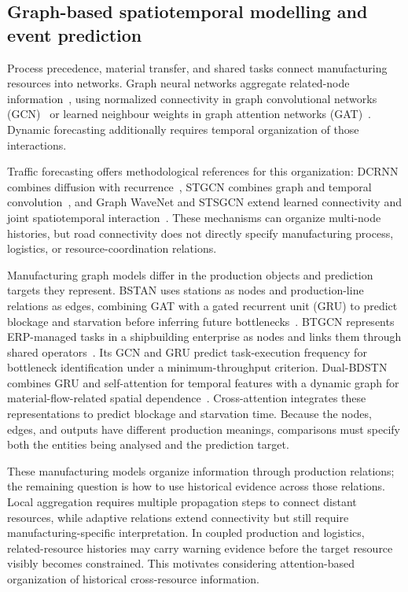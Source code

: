 \documentclass[a4paper,fleqn]{cas-dc}
\begin{document}
\subsection{Graph-based spatiotemporal modelling and event prediction}

Process precedence, material transfer, and shared tasks connect manufacturing resources into networks. Graph neural networks aggregate related-node information~\cite{wu2021gnn}, using normalized connectivity in graph convolutional networks (GCN)~\cite{kipf2017gcn} or learned neighbour weights in graph attention networks (GAT)~\cite{velickovic2018gat}. Dynamic forecasting additionally requires temporal organization of those interactions.

Traffic forecasting offers methodological references for this organization: DCRNN combines diffusion with recurrence~\cite{li2018dcrnn}, STGCN combines graph and temporal convolution~\cite{yu2018stgcn}, and Graph WaveNet and STSGCN extend learned connectivity and joint spatiotemporal interaction~\cite{wu2019graphwavenet,song2020stsgcn}. These mechanisms can organize multi-node histories, but road connectivity does not directly specify manufacturing process, logistics, or resource-coordination relations.

Manufacturing graph models differ in the production objects and prediction targets they represent. BSTAN uses stations as nodes and production-line relations as edges, combining GAT with a gated recurrent unit (GRU) to predict blockage and starvation before inferring future bottlenecks~\cite{lai2023bstan}. BTGCN represents ERP-managed tasks in a shipbuilding enterprise as nodes and links them through shared operators~\cite{yin2025btgcn}. Its GCN and GRU predict task-execution frequency for bottleneck identification under a minimum-throughput criterion. Dual-BDSTN combines GRU and self-attention for temporal features with a dynamic graph for material-flow-related spatial dependence~\cite{cen2025dstnn}. Cross-attention integrates these representations to predict blockage and starvation time. Because the nodes, edges, and outputs have different production meanings, comparisons must specify both the entities being analysed and the prediction target.

These manufacturing models organize information through production relations; the remaining question is how to use historical evidence across those relations. Local aggregation requires multiple propagation steps to connect distant resources, while adaptive relations extend connectivity but still require manufacturing-specific interpretation. In coupled production and logistics, related-resource histories may carry warning evidence before the target resource visibly becomes constrained. This motivates considering attention-based organization of historical cross-resource information.
\end{document}
